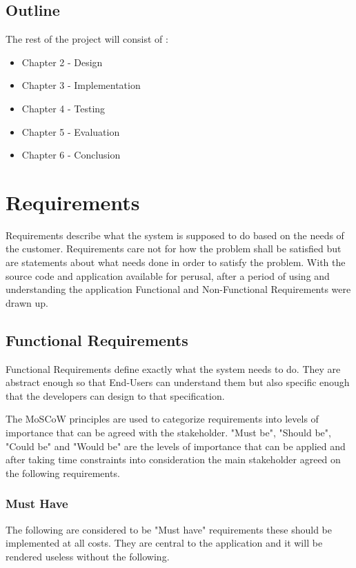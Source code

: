 \documentclass{l4proj}
\begin{document}
\section{Outline}
The rest of the project will consist of :

\begin{itemize}
\item Chapter 2 - Design
\item Chapter 3 - Implementation
\item Chapter 4 - Testing
\item Chapter 5 - Evaluation
\item Chapter 6 - Conclusion
\end{itemize}

\chapter{Requirements}
Requirements describe what the system is supposed to do based on the needs of the customer.  Requirements care not for how the problem shall be satisfied but are statements about what needs done in order to satisfy the problem. With the source code and application available for perusal, after a period of using and understanding the application Functional and Non-Functional Requirements were drawn up.

\section{Functional Requirements}
Functional Requirements define exactly what the system needs to do. They are abstract enough so that End-Users can understand them but also specific enough that the developers can design to that specification.

The MoSCoW principles are used to categorize requirements into levels of importance that can be agreed with the stakeholder.  "Must be", "Should be", "Could be" and "Would be" are the levels of importance that can be applied and after taking time constraints into consideration the main stakeholder agreed on the following requirements.  

\subsection{Must Have}
The following are considered to be "Must have" requirements these should be implemented at all costs. They are central to the application and it will be rendered useless without the following.
\end{document}
